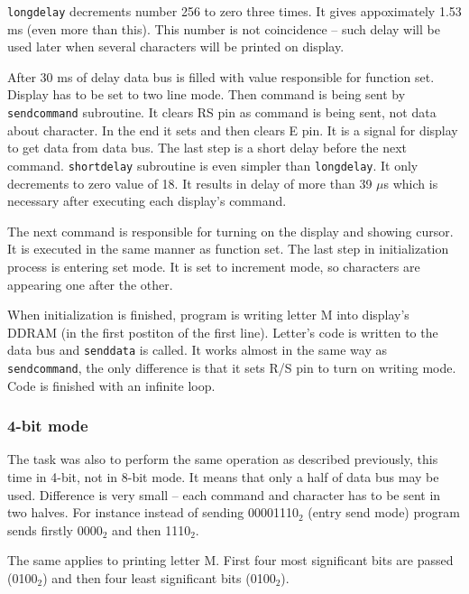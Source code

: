 \documentclass{article}
\begin{document}
\texttt{long\textunderscore delay} decrements number 256 to zero three times. It gives
appoximately 1.53 ms (even more than this). This number is not coincidence -- such delay
will be used later when several characters will be printed on display.

After 30 ms of delay data bus is filled with value responsible for function set. 
Display has to be set to two line mode. Then command is being sent by \texttt{send\textunderscore command}
subroutine. It clears RS pin as command is being sent, not data about character. In the end
it sets and then clears E pin. It is a signal for display to get data from data bus. The last
step is a short delay before the next command. \texttt{short\textunderscore delay} subroutine
is even simpler than \texttt{long\textunderscore delay}. It only decrements to zero value of 18.
It results in delay of more than 39 $\mu$s which is necessary after executing each display's command.

The next command is responsible for turning on the display and showing cursor. It is executed
in the same manner as function set. The last step in initialization process is entering
set mode. It is set to increment mode, so characters are appearing one after the other.

When initialization is finished, program is writing letter M into display's DDRAM (in the first postiton of the first line).
Letter's code is written to the data bus and \texttt{send\textunderscore data} is called.
It works almost in the same way as \texttt{send\textunderscore command}, the only difference is that
it sets R/S pin to turn on writing mode. Code is finished with an infinite loop.

\subsubsection{4-bit mode}
The task was also to perform the same operation as described previously, this time in 4-bit,
not in 8-bit mode. It means that only a half of data bus may be used. Difference is very
small -- each command and character has to be sent in two halves. For instance
instead of sending 00001110$_2$ (entry send mode) program sends firstly 0000$_2$ and then 1110$_2$.

The same applies to printing letter M. First four most significant bits are passed
(0100$_2$) and then four least significant bits (0100$_2$).

\newpage
\end{document}
